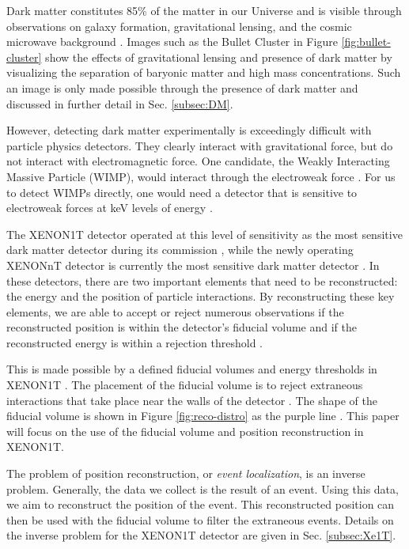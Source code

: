 \documentclass[../thesis.tex]{subfiles}
\begin{document}
Dark matter constitutes 85\% of the matter in our Universe and is visible through observations on galaxy formation, gravitational lensing, and the cosmic microwave background \cite{DM_Hist}.
Images such as the Bullet Cluster in Figure \ref{fig:bullet-cluster} show the effects of gravitational lensing and presence of dark matter by visualizing the separation of baryonic matter and high mass concentrations.
Such an image is only made possible through the presence of dark matter and discussed in further detail in Sec. \ref{subsec:DM}.

\par However, detecting dark matter experimentally is exceedingly difficult with particle physics detectors.
They clearly interact with gravitational force, but do not interact with electromagnetic force.
One candidate, the Weakly Interacting Massive Particle (WIMP), would interact through the electroweak force \cite{DM_Hist}.
For us to detect WIMPs directly, one would need a detector that is sensitive to electroweak forces at keV levels of energy \cite{DM_Hist}.

\par The XENON1T detector operated at this level of sensitivity as the most sensitive dark matter detector during its commission \cite{Xenon1t}, while the newly operating XENONnT detector is currently the most sensitive dark matter detector \cite{nT_Projection}.
In these detectors, there are two important elements that need to be reconstructed: the energy and the position of particle interactions.
By reconstructing these key elements, we are able to accept or reject numerous observations if the reconstructed position is within the detector's fiducial volume and if the reconstructed energy is within a rejection threshold \cite{1TDM_DataAnalysis}.

\par This is made possible by a defined fiducial volumes and energy thresholds in XENON1T \cite{1TDM_DataAnalysis}.
The placement of the fiducial volume is to reject extraneous interactions that take place near the walls of the detector \cite{1TDM_DataAnalysis}.
The shape of the fiducial volume is shown in Figure \ref{fig:reco-distro} as the purple line \cite{Xe1T-YearExpo}.
This paper will focus on the use of the fiducial volume and position reconstruction in XENON1T.

\par The problem of position reconstruction, or \textit{event localization}, is an inverse problem.
Generally, the data we collect is the result of an event.
Using this data, we aim to reconstruct the position of the event.
This reconstructed position can then be used with the fiducial volume to filter the extraneous events.
Details on the inverse problem for the XENON1T detector are given in Sec. \ref{subsec:Xe1T}.
\end{document}
